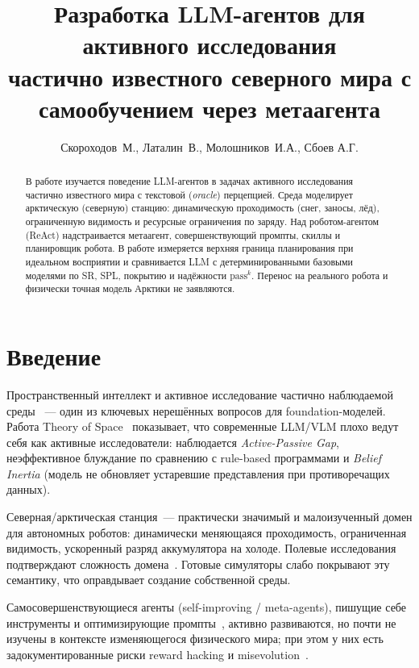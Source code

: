 \documentclass[11pt,a4paper]{article}
\title{%
  Разработка LLM-агентов для активного исследования\\
  частично известного северного мира с самообучением через метаагента%
}
\author{%
  Скороходов~М., Латалин~В., Молошников~И.А., Сбоев А.Г.%
  \and
  \todo{соавторы}%
}
\date{\todo{дата}}
\begin{document}
\maketitle

\begin{abstract}
В работе изучается поведение LLM-агентов в задачах активного исследования частично известного мира с текстовой (\emph{oracle}) перцепцией.
Среда моделирует арктическую (северную) станцию: динамическую проходимость
(снег, заносы, лёд), ограниченную видимость и ресурсные ограничения по заряду.
Над роботом-агентом (ReAct) надстраивается метаагент, совершенствующий промпты, скиллы и планировщик робота. В работе измеряется верхняя граница планирования при идеальном восприятии и
сравнивается LLM с детерминированными базовыми моделями по SR, SPL, покрытию и
надёжности \(\mathrm{pass}^k\).
Перенос на реального робота и физически точная модель Арктики не заявляются.
\end{abstract}


\section{Введение}
\label{sec:intro}

Пространственный интеллект и активное исследование частично наблюдаемой среды~
--- один из ключевых нерешённых вопросов для foundation-моделей.
Работа Theory of Space~\cite{theoryofspace2026} показывает, что современные
LLM/VLM плохо ведут себя как активные исследователи: наблюдается
\emph{Active-Passive Gap}, неэффективное блуждание по сравнению с rule-based
программами и \emph{Belief Inertia} (модель не обновляет устаревшие представления
при противоречащих данных).

Северная/арктическая станция~--- практически значимый и малоизученный домен
для автономных роботов: динамически меняющаяся проходимость, ограниченная
видимость, ускоренный разряд аккумулятора на холоде.
Полевые исследования подтверждают сложность домена~\cite{baril2022snow}.
Готовые симуляторы слабо покрывают эту семантику, что оправдывает
создание собственной среды.

Самосовершенствующиеся агенты (self-improving / meta-agents), пишущие себе
инструменты и оптимизирующие промпты~\cite{wang2023voyager,shinn2023reflexion},
активно развиваются, но почти не изучены в контексте изменяющегося физического
мира; при этом у них есть задокументированные риски reward hacking и
misevolution~\cite{selfimprovingrisks2025,misevolution2025,rewardhacking2025}.
\end{document}
